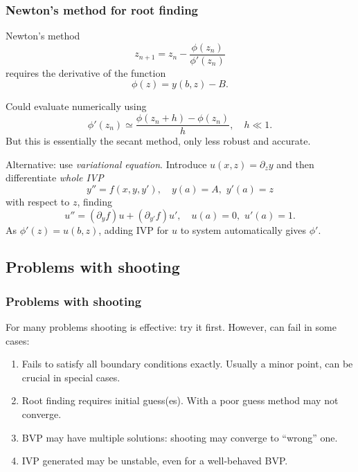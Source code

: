 \documentclass{beamer}
\begin{document}
\begin{frame}
  \frametitle{Newton's method for root finding}

  \begin{overlayarea}{\textwidth}{0.8\textheight}
    {
      Newton's method
      \begin{equation*}
        z_{n+1} = z_n - \frac{\phi(z_n)}{\phi'(z_n)}
      \end{equation*}
      requires the derivative of the function
      \begin{equation*}
        \phi(z) = y(b, z) - B.
      \end{equation*}
    }
    {

      Could evaluate numerically using
      \begin{equation*}
        \phi'(z_n) \simeq \frac{ \phi(z_n + h) - \phi(z_n) }{h}, \quad h
        \ll 1.
      \end{equation*}
      But this is essentially the secant method, only less robust and
      accurate.
    }
    {
      Alternative: use \emph{variational equation}.
      Introduce $u(x,z) = \partial_z y$ and then differentiate
      \emph{whole IVP}
      \begin{equation*}
        y'' = f(x, y, y'), \quad y(a) = A, \,\, y'(a) = z
      \end{equation*}
      with respect to $z$, finding
      \begin{equation*}
        u'' = (\partial_y f) u + (\partial_{y'} f) u', \quad u(a) = 0,
        \,\, u'(a) = 1.
      \end{equation*}
      As $\phi'(z) = u(b, z)$, adding IVP for $u$ to system
      automatically gives $\phi'$.
    }
  \end{overlayarea}

\end{frame}


\subsection{Problems with shooting}

\begin{frame}
  \frametitle{Problems with shooting}

  For many problems shooting is effective: try it first. However, can
  fail in some cases:
  \begin{enumerate}
  \item<2-> Fails to satisfy all boundary conditions exactly. Usually
    a minor point, can be crucial in special cases.
  \item<3-> Root finding requires initial guess(es). With a poor guess
    method may not converge.
  \item<4-> BVP may have multiple solutions: shooting may converge to
    ``wrong'' one.
  \item<5-> IVP generated may be unstable, even for a well-behaved
    BVP.
  \end{enumerate}

\end{frame}
\end{document}
